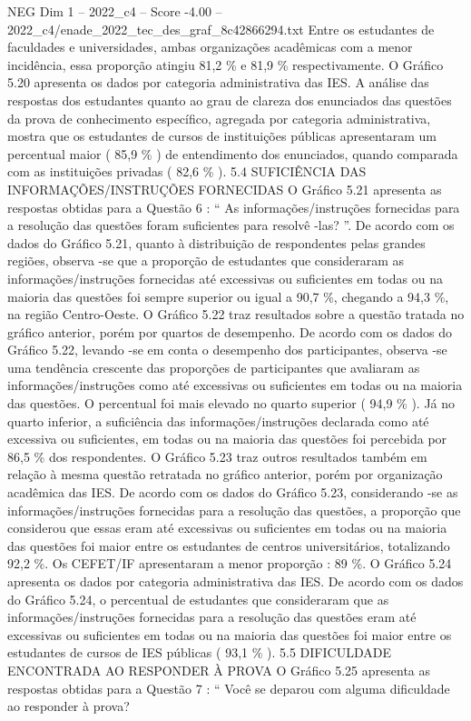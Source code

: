 \begin{textsample}{NEG Dim 1 – 2022\_c4 – Score -4.00 – 2022\_c4/enade\_2022\_tec\_des\_graf\_8c42866294.txt}
Entre os estudantes de faculdades e universidades, ambas organizações acadêmicas com a menor incidência, essa proporção atingiu 81,2 \% e 81,9 \% respectivamente.
O Gráfico 5.20 apresenta os dados por categoria administrativa das IES.
A análise das respostas dos estudantes quanto ao grau de clareza dos enunciados das questões da prova de conhecimento específico, agregada por categoria administrativa, mostra que os estudantes de cursos de instituições públicas apresentaram um percentual maior ( 85,9 \% ) de entendimento dos enunciados, quando comparada com as instituições privadas ( 82,6 \% ). 5.4 SUFICIÊNCIA DAS INFORMAÇÕES/INSTRUÇÕES FORNECIDAS O Gráfico 5.21 apresenta as respostas obtidas para a Questão 6 : “ As informações/instruções fornecidas para a resolução das questões foram suficientes para resolvê -las? ”.
De acordo com os dados do Gráfico 5.21, quanto à distribuição de respondentes pelas grandes regiões, observa -se que a proporção de estudantes que consideraram as informações/instruções fornecidas até excessivas ou suficientes em todas ou na maioria das questões foi sempre superior ou igual a 90,7 \%, chegando a 94,3 \%, na região Centro-Oeste.
O Gráfico 5.22 traz resultados sobre a questão tratada no gráfico anterior, porém por quartos de desempenho.
De acordo com os dados do Gráfico 5.22, levando -se em conta o desempenho dos participantes, observa -se uma tendência crescente das proporções de participantes que avaliaram as informações/instruções como até excessivas ou suficientes em todas ou na maioria das questões.
O percentual foi mais elevado no quarto superior ( 94,9 \% ).
Já no quarto inferior, a suficiência das informações/instruções declarada como até excessiva ou suficientes, em todas ou na maioria das questões foi percebida por 86,5 \% dos respondentes.
O Gráfico 5.23 traz outros resultados também em relação à mesma questão retratada no gráfico anterior, porém por organização acadêmica das IES.
De acordo com os dados do Gráfico 5.23, considerando -se as informações/instruções fornecidas para a resolução das questões, a proporção que considerou que essas eram até excessivas ou suficientes em todas ou na maioria das questões foi maior entre os estudantes de centros universitários, totalizando 92,2 \%.
Os CEFET/IF apresentaram a menor proporção : 89 \%.
O Gráfico 5.24 apresenta os dados por categoria administrativa das IES.
De acordo com os dados do Gráfico 5.24, o percentual de estudantes que consideraram que as informações/instruções fornecidas para a resolução das questões eram até excessivas ou suficientes em todas ou na maioria das questões foi maior entre os estudantes de cursos de IES públicas ( 93,1 \% ). 5.5 DIFICULDADE ENCONTRADA AO RESPONDER À PROVA O Gráfico 5.25 apresenta as respostas obtidas para a Questão 7 : “ Você se deparou com alguma dificuldade ao responder à prova?

\end{textsample}

